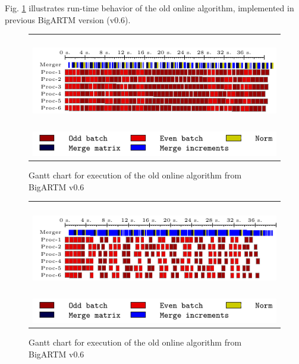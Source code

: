 \documentclass[russian,english]{llncs}
\newcommand{\kw}[1]{\textsf{#1}}
\begin{document}
Fig. \ref{fig:gantt:oldonline} illustrates run-time behavior of the old \kw{online algorithm}, implemented in previous BigARTM version (\kw{v0.6}).

\begin{figure}[h]
	\centering
	\begin{tabular}{c}
		\includegraphics[height=4cm, width=12cm]{plots/old.pdf} \\
		\includegraphics[scale=1]{plots/legend_old.pdf}
	\end{tabular}
	\caption{Gantt chart for execution of the old online algorithm from BigARTM \kw{v0.6}} \label{fig:gantt:oldonline}
\end{figure}

\begin{figure}[h]
	\centering
	\begin{tabular}{c}
		\includegraphics[height=4cm, width=12cm]{plots/old_slow.pdf} \\
		\includegraphics[scale=1]{plots/legend_old.pdf}
	\end{tabular}
	\caption{Gantt chart for execution of the old online algorithm from BigARTM \kw{v0.6}} \label{fig:gantt:oldonlineslow}
\end{figure}
\end{document}
